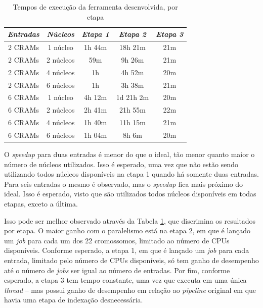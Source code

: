 \documentclass[cic,tc]{iiufrgs}
\begin{document}
\begin{table}[h]
    \caption{Tempos de execução da ferramenta desenvolvida, por etapa}
    \centering
        \begin{tabular}{c|c|c|c|c}
          \hline
          \textit{Entradas}  & \textit{Núcleos} & \textit{Etapa 1}  & \textit{Etapa 2} & \textit{Etapa 3} \\
          \hline
          \hline
          2 CRAMs & 1 núcleo  & 1h 44m &    18h 21m & 21m \\
          2 CRAMs & 2 núcleos &    59m &     9h 26m & 21m \\
          2 CRAMs & 4 núcleos & 1h     &     4h 52m & 20m \\
          2 CRAMs & 6 núcleos & 1h     &     3h 38m & 21m \\
          6 CRAMs & 1 núcleo  & 4h 12m & 1d 21h  2m & 20m \\
          6 CRAMs & 2 núcleos & 2h 41m &    21h 55m & 22m \\
          6 CRAMs & 4 núcleos & 1h 40m &    11h 15m & 21m \\
          6 CRAMs & 6 núcleos & 1h 04m &     8h  6m & 20m \\
          \hline
        \end{tabular}
    \label{tbl:stages}
\end{table}

O \textit{speedup} para duas entradas é menor do que o ideal, tão menor quanto
maior o número de núcleos utilizados. Isso é esperado, uma vez que não estão
sendo utilizando todos núcleos disponíveis na etapa 1 quando há somente duas
entradas. Para seis entradas o mesmo é observado, mas o \textit{speedup} fica
mais próximo do ideal. Isso é esperado, visto que são utilizados todos núcleos
disponíveis em todas etapas, exceto a última.

Isso pode ser melhor observado através da Tabela \ref{tbl:stages}, que
discrimina os resultados por etapa. O maior ganho com o paralelismo está na
etapa 2, em que é lançado um \textit{job} para cada um dos 22 cromossomos,
limitado ao número de CPUs disponíveis. Conforme esperado, a etapa 1, em que é
lançado um \textit{job} para cada entrada, limitado pelo número de CPUs
disponíveis, só tem ganho de desempenho até o número de \textit{jobs} ser igual
ao número de entradas. Por fim, conforme esperado, a etapa 3 tem tempo
constante, uma vez que executa em uma única \textit{thread} -- mas possui ganho
de desempenho em relação ao \textit{pipeline} original em que havia uma etapa
de indexação desnecessária.
\end{document}
